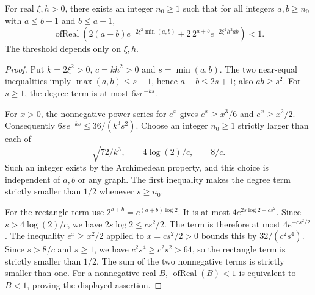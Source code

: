 \begin{lemma}
For real $\xi,h>0$, there exists an integer $n_0\geq1$ such that for
all integers $a,b\geq n_0$ with $a\leq b+1$ and $b\leq a+1$,
\[
\operatorname{ofReal}\left(
 2(a+b)e^{-2\xi^2\min(a,b)}
 +2\,2^{a+b}e^{-2\xi^2h^2ab}\right)<1.
\]
The threshold depends only on $\xi,h$.
\end{lemma}
\begin{proof}
Put $k=2\xi^2>0$, $c=kh^2>0$ and $s=\min(a,b)$. The two
near-equal inequalities imply $\max(a,b)\leq s+1$, hence
$a+b\leq2s+1$; also $ab\geq s^2$. For $s\geq1$, the degree term is
at most $6s e^{-ks}$.

For $x>0$, the nonnegative power series for $e^x$ gives
$e^x\geq x^3/6$ and $e^x\geq x^2/2$. Consequently
$6s e^{-ks}\leq36/(k^3s^2)$. Choose an integer $n_0\geq1$ strictly
larger than each of
\[
\sqrt{72/k^3},\qquad 4\log(2)/c,\qquad 8/c.
\]
Such an integer exists by the Archimedean property, and this choice is
independent of $a,b$ or any graph. The first inequality makes the
degree term strictly smaller than $1/2$ whenever $s\geq n_0$.

For the rectangle term use $2^{a+b}=e^{(a+b)\log2}$. It is at most
$4e^{2s\log2-cs^2}$. Since $s>4\log(2)/c$, we have
$2s\log2\leq cs^2/2$. The term is therefore at most
$4e^{-cs^2/2}$. The inequality $e^x\geq x^2/2$ applied to
$x=cs^2/2>0$ bounds this by $32/(c^2s^4)$.
Since $s>8/c$ and $s\geq1$, we have
$c^2s^4\geq c^2s^2>64$, so the rectangle term is strictly smaller
than $1/2$. The sum of the two nonnegative terms is strictly smaller
than one. For a nonnegative real $B$, $\operatorname{ofReal}(B)<1$
is equivalent to $B<1$, proving the displayed assertion.
\end{proof}
